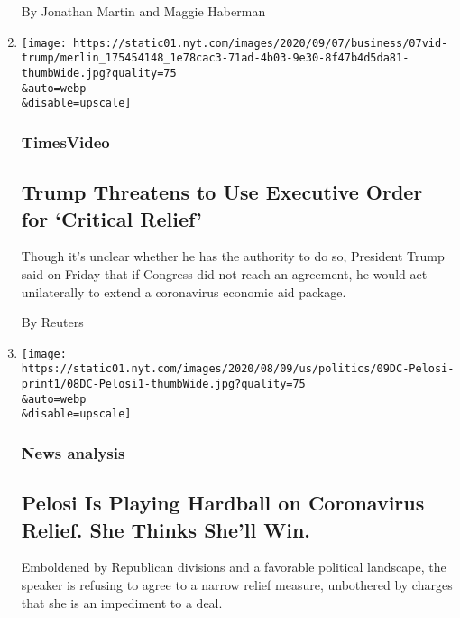 \begin{enumerate}
  By Jonathan Martin and Maggie Haberman
\item
  \href{/video/us/politics/100000007279339/trump-says-he-will-act-on-his-own-if-congress-doesnt-agree-on-relief.html}{}

  \texttt{[image: https://static01.nyt.com/images/2020/09/07/business/07vid-trump/merlin\_175454148\_1e78cac3-71ad-4b03-9e30-8f47b4d5da81-thumbWide.jpg?quality=75\\\&auto=webp\\\&disable=upscale]}

  \hypertarget{timesvideo}{%
  \subsubsection{TimesVideo}\label{timesvideo}}

  \hypertarget{trump-threatens-to-use-executive-order-for-critical-relief}{%
  \subsection{Trump Threatens to Use Executive Order for `Critical
  Relief'}\label{trump-threatens-to-use-executive-order-for-critical-relief}}

  Though it's unclear whether he has the authority to do so, President
  Trump said on Friday that if Congress did not reach an agreement, he
  would act unilaterally to extend a coronavirus economic aid package.

  By Reuters
\item
  \href{/2020/08/08/us/politics/nancy-pelosi-coronavirus-relief.html}{}

  \texttt{[image: https://static01.nyt.com/images/2020/08/09/us/politics/09DC-Pelosi-print1/08DC-Pelosi1-thumbWide.jpg?quality=75\\\&auto=webp\\\&disable=upscale]}

  \hypertarget{news-analysis-1}{%
  \subsubsection{News analysis}\label{news-analysis-1}}

  \hypertarget{pelosi-is-playing-hardball-on-coronavirus-relief-she-thinks-shell-win-1}{%
  \subsection{Pelosi Is Playing Hardball on Coronavirus Relief. She
  Thinks She'll
  Win.}\label{pelosi-is-playing-hardball-on-coronavirus-relief-she-thinks-shell-win-1}}

  Emboldened by Republican divisions and a favorable political
  landscape, the speaker is refusing to agree to a narrow relief
  measure, unbothered by charges that she is an impediment to a deal.


\end{enumerate}

